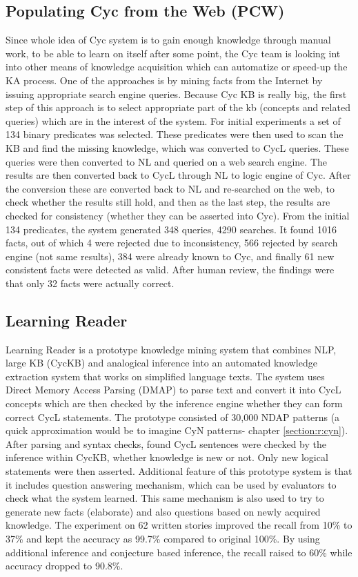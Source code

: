 \subsection{Populating Cyc from the Web (PCW)}
\label{section:r:pcw}
Since whole idea of Cyc system is to gain enough knowledge through manual work,
to be able to learn on itself after some point, the Cyc team is looking int into 
other means of knowledge acquisition which can automatize or speed-up the KA 
process. One of the approaches is by mining facts from the Internet by issuing 
appropriate search engine queries\parencite{Matuszek2004}. Because Cyc KB is 
really big, the first step of this approach is to select appropriate part of 
the kb (concepts and related queries) which are in the interest of the system.
For initial experiments  a set of 134 binary predicates was selected. These 
predicates were then used to scan the KB and find the missing knowledge, which 
was converted to CycL queries. 
These queries were then converted to NL and queried on a web search engine. 
The results are then converted back to CycL through NL to logic engine of Cyc. 
After the conversion these are converted back to NL and re-searched on the web,
to check whether the results still hold, and then as the last step, the 
results are checked for consistency (whether they can be asserted into Cyc). 
From the initial 134 predicates, the system generated 348 queries, 
4290 searches. It found 1016 facts, out of which 4 were rejected
due to inconsistency, 566 rejected by search engine (not same results), 384 
were already known to Cyc, and finally 61 new consistent facts were detected 
as valid. After human review, the findings were that only 32 facts were 
actually correct.

\subsection{Learning Reader}
\label{section:r:lr}
Learning Reader\parencite{Forbus2007} is a prototype knowledge mining system
that combines NLP, large KB (CycKB) and analogical inference into an automated 
knowledge extraction system that works on simplified language texts. The system
uses Direct Memory Access Parsing (DMAP\parencite{Martin1986}) to parse text
and convert it into CycL concepts which are then checked by the inference engine
whether they can form correct CycL statements. The prototype consisted of
30,000 NDAP patterns (a quick approximation would be to imagine CyN patterns-
chapter \ref{section:r:cyn}). After parsing and syntax checks, found CycL 
sentences were checked by the inference within CycKB, whether knowledge is new
or not. Only new logical statements were then asserted. Additional feature of
this prototype system is that it includes question answering mechanism, which 
can be used by evaluators to check what the system learned. This same mechanism
is also used to try to generate new facts (elaborate) and also questions based
on newly acquired knowledge. The experiment on 62 written stories improved the
recall from 10\% to 37\% and kept the accuracy as 99.7\% compared to original 
100\%. By using additional inference and conjecture based inference, the recall
raised to 60\% while accuracy dropped to 90.8\%.

